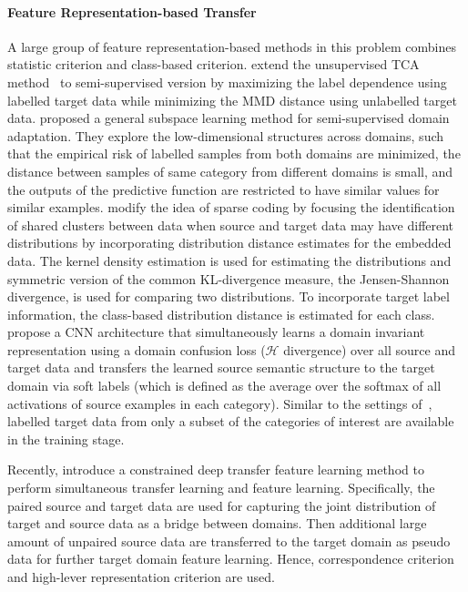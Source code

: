 \documentclass[prodmode]{acmsmall}  %
\begin{document}
\paragraph{Feature Representation-based Transfer}
A large group of feature representation-based methods in this problem combines statistic criterion and class-based criterion.  extend the unsupervised TCA method~\cite{Pan2009} to semi-supervised version by maximizing the label dependence using labelled target data while minimizing the MMD distance using unlabelled target data.  proposed a general subspace learning method for semi-supervised domain adaptation. They explore the low-dimensional structures across domains, such that the empirical risk of labelled samples from both domains are minimized, the distance between samples of same category from different domains is small, and the outputs of the predictive function are restricted to have similar values for similar examples. 
 modify the idea of sparse coding by focusing the identification of shared clusters between data when source and target data may have different distributions by incorporating distribution distance estimates for the embedded data. The kernel density estimation is used for estimating the distributions and symmetric version of the common KL-divergence measure, the Jensen-Shannon divergence, is used for comparing two distributions. To incorporate target label information, the class-based distribution distance is estimated for each class.
 propose a CNN architecture that simultaneously learns a domain invariant representation using a domain confusion loss ($\mathcal{H}$ divergence) over all source and target data and transfers the learned source semantic structure to the target domain via soft labels (which is defined as the average over the softmax of all activations of source examples in each category). Similar to the settings of~\cite{Saenko2010}, labelled target data from only a subset of the categories of interest are available in the training stage. 

Recently,  introduce a constrained deep transfer feature learning method to perform simultaneous transfer learning and feature learning.  
Specifically, the paired source and target data are used for capturing the joint distribution of target and source data as a bridge between domains. Then additional large amount of unpaired source data are transferred to the target domain as pseudo data for further target domain feature learning. Hence, correspondence criterion and high-lever representation criterion are used.
\end{document}
